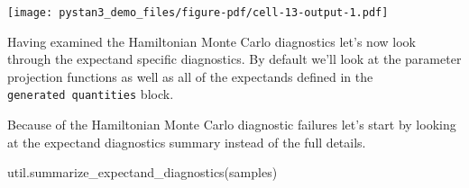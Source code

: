 \documentclass[
  letterpaper,
  DIV=11,
  numbers=noendperiod]{scrartcl}
\newenvironment{Shaded}{\begin{snugshade}}{\end{snugshade}}
\newcommand{\NormalTok}[1]{\textcolor[rgb]{0.00,0.23,0.31}{#1}}
\begin{document}
\texttt{[image: pystan3\_demo\_files/figure-pdf/cell-13-output-1.pdf]}

Having examined the Hamiltonian Monte Carlo diagnostics let's now look
through the expectand specific diagnostics. By default we'll look at the
parameter projection functions as well as all of the expectands defined
in the \texttt{generated\ quantities} block.

Because of the Hamiltonian Monte Carlo diagnostic failures let's start
by looking at the expectand diagnostics summary instead of the full
details.

\begin{Shaded}
\begin{Highlighting}[]
\NormalTok{util.summarize\_expectand\_diagnostics(samples)}
\end{Highlighting}
\end{Shaded}
\end{document}
